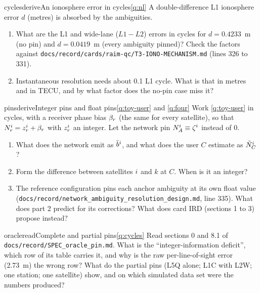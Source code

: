 \begin{question}{cycles}{derive}{An ionosphere error in cycles}{\ref{q:nl}}
A double-difference L1 ionosphere error $d$ (metres) is absorbed by the
ambiguities.
\begin{enumerate}[leftmargin=*, itemsep=1pt]
\item What are the L1 and wide-lane ($L1 - L2$) errors in cycles for
      $d = 0.4233$~m (no pin) and $d = 0.0419$~m (every ambiguity pinned)? Check
      the factors against \texttt{docs/record/cards/raim-qc/T3-IONO-MECHANISM.md} (lines
      326 to 331).
\item Instantaneous resolution needs about 0.1 L1 cycle. What is that in metres
      and in TECU, and by what factor does the no-pin case miss it?
\end{enumerate}
\end{question}

\begin{question}{pins}{derive}{Integer pins and float pins}{\ref{q:toy-user} and \ref{q:four}}
Work \cref{q:toy-user} in cycles, with a receiver phase bias $\beta_r$ (the same
for every satellite), so that $N^i_r = z^i_r + \beta_r$ with
$z^i_r$ an integer. Let the network pin $N^i_A \equiv \zeta^i$ instead of 0.
\begin{enumerate}[leftmargin=*, itemsep=1pt]
\item What does the network emit as $\bar b^i$, and what does the user $C$
      estimate as $\tilde N^i_C$?
\item Form the difference between satellites $i$ and $k$ at $C$. When is it an
      integer?
\item The reference configuration pins each anchor ambiguity at its own float
      value (\texttt{docs/record/network\_ambiguity\_resolution\_design.md}, line 335).
      What does part 2 predict for its corrections? What does card IRD (sections
      1 to 3) propose instead?
\end{enumerate}
\end{question}

\begin{question}{oracle}{read}{Complete and partial pins}{\ref{q:cycles}}
Read sections 0 and 8.1 of \texttt{docs/record/SPEC\_oracle\_pin.md}. What is the
``integer-information deficit'', which row of its table carries it, and why is the
raw per-line-of-sight error (2.73~m) the wrong row? What do the partial pins
(L5Q alone; L1C with L2W; one station; one satellite) show, and on which simulated
data set were the numbers produced?
\end{question}

